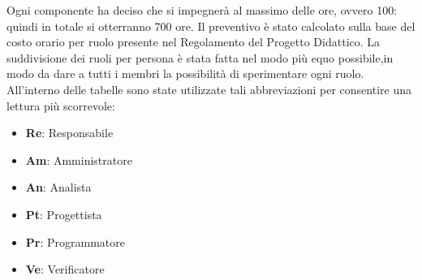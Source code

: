 Ogni componente ha deciso che si impegnerà al massimo delle ore, ovvero 100: quindi in totale si otterranno 700 ore. Il preventivo è stato calcolato sulla base del costo orario per ruolo presente nel Regolamento del Progetto Didattico. La suddivisione dei ruoli per persona è stata fatta nel modo più equo possibile,in modo da dare a tutti i membri la possibilità di 
sperimentare ogni ruolo. \\ 
All'interno delle tabelle sono state utilizzate tali abbreviazioni per consentire una lettura più scorrevole:
\begin{itemize}
    \item \textbf{Re}: Responsabile
    \item \textbf{Am}: Amministratore
    \item \textbf{An}: Analista
    \item \textbf{Pt}: Progettista
    \item \textbf{Pr}: Programmatore
    \item \textbf{Ve}: Verificatore
\end{itemize}

